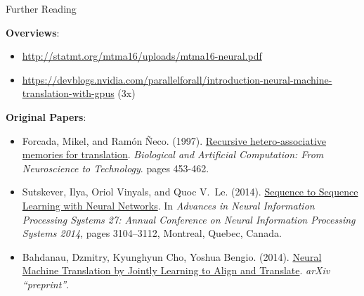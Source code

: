 \documentclass[xcolor=pdftex,x11names,table,hyperref]{beamer}
\begin{document}
\begin{frame}{Further Reading}

\textbf{Overviews}: \\[0.5em]
\begin{minipage}{1.2\textwidth}
\begin{tiny}
\begin{itemize}
	\item \url{http://statmt.org/mtma16/uploads/mtma16-neural.pdf}
	\item \url{https://devblogs.nvidia.com/parallelforall/introduction-neural-machine-translation-with-gpus} (3x)
\end{itemize}
\end{tiny}
\end{minipage}

\vspace{1.0em}
\textbf{Original Papers}:
\begin{tiny}
\begin{itemize}
	\item Forcada, Mikel, and  Ram\'{o}n \~{N}eco. (1997). \href{http://citeseerx.ist.psu.edu/viewdoc/summary?doi=10.1.1.43.1968}{Recursive hetero-associative memories for translation}. \textit{Biological and Artificial Computation: From Neuroscience to Technology}. pages 453-462.
	\item Sutskever, Ilya, Oriol Vinyals, and Quoc V.\ Le.  (2014). \href{http://papers.nips.cc/paper/5346-sequence-to-sequence-learning-with-neural-networks.pdf}{Sequence to Sequence Learning with Neural Networks}. In \textit{Advances in Neural Information Processing Systems 27: Annual Conference on Neural Information Processing Systems 2014}, pages 3104–3112, Montreal, Quebec, Canada.
	\item Bahdanau, Dzmitry, Kyunghyun Cho, Yoshua Bengio. (2014). \href{https://arxiv.org/abs/1409.0473}{Neural Machine Translation by Jointly Learning to Align and Translate}. \textit{arXiv ``preprint''}.
\end{itemize}
\end{tiny}
\end{frame}





\end{document}
